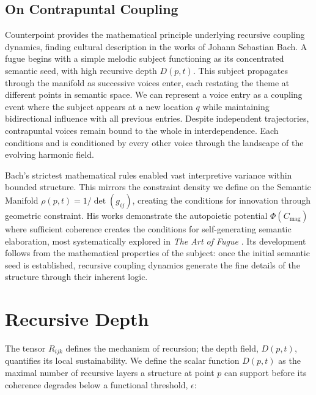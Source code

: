 
\subsection{On Contrapuntal Coupling}
\label{sec:on_contrapuntal_coupling}

Counterpoint provides the mathematical principle underlying recursive coupling dynamics, finding cultural description in the works of Johann Sebastian Bach. A fugue begins with a simple melodic subject functioning as its concentrated semantic seed, with high recursive depth \(D(p,t)\). This subject propagates through the manifold as successive voices enter, each restating the theme at different points in semantic space. We can represent a voice entry as a coupling event where the subject appears at a new location \(q\) while maintaining bidirectional influence with all previous entries. Despite independent trajectories, contrapuntal voices remain bound to the whole in interdependence. Each conditions and is conditioned by every other voice through the landscape of the evolving harmonic field.

Bach's strictest mathematical rules enabled vast interpretive variance within bounded structure. This mirrors the constraint density we define on the Semantic Manifold \(\rho(p,t) = 1/\det(g_{ij})\), creating the conditions for innovation through geometric constraint. His works demonstrate the autopoietic potential \(\Phi(C_{\text{mag}})\) where sufficient coherence creates the conditions for self-generating semantic elaboration, most systematically explored in \textit{The Art of Fugue} \autocite{Bach1751}. Its development follows from the mathematical properties of the subject: once the initial semantic seed is established, recursive coupling dynamics generate the fine details of the structure through their inherent logic.


\section{Recursive Depth}
\label{sec:recursive_depth}

The tensor \(R_{ijk}\) defines the mechanism of recursion; the depth field, \(D(p, t)\), quantifies its local sustainability. We define the scalar function \(D(p,t)\) as the maximal number of recursive layers a structure at point \(p\) can support before its coherence degrades below a functional threshold, \(\epsilon\):

